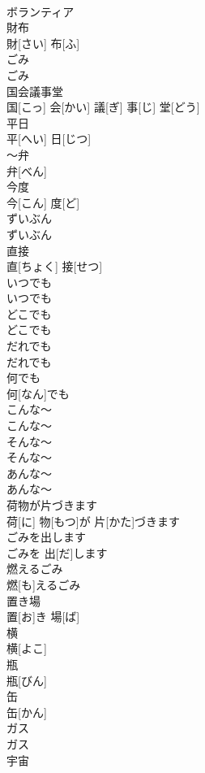 \documentclass[8pt]{extreport}
\begin{document}
\begin{CJK}{UTF8}{min}
\\	ボランティア		
\\	財布	
\\	財[さい] 布[ふ]		
\\	ごみ	
\\	ごみ		
\\	国会議事堂	
\\	国[こっ] 会[かい] 議[ぎ] 事[じ] 堂[どう]		
\\	平日	
\\	平[へい] 日[じつ]		
\\	～弁	
\\	弁[べん]		
\\	今度	
\\	今[こん] 度[ど]		
\\	ずいぶん	
\\	ずいぶん		
\\	直接	
\\	直[ちょく] 接[せつ]		
\\	いつでも	
\\	いつでも		
\\	どこでも	
\\	どこでも		
\\	だれでも	
\\	だれでも		
\\	何でも	
\\	何[なん]でも		
\\	こんな～	
\\	こんな～		
\\	そんな～	
\\	そんな～		
\\	あんな～	
\\	あんな～		
\\	荷物が片づきます	
\\	荷[に] 物[もつ]が 片[かた]づきます		
\\	ごみを出します	
\\	ごみを 出[だ]します		
\\	燃えるごみ	
\\	燃[も]えるごみ		
\\	置き場	
\\	置[お]き 場[ば]		
\\	横	
\\	横[よこ]		
\\	瓶	
\\	瓶[びん]		
\\	缶	
\\	缶[かん]		
\\	ガス	
\\	ガス		
\\	宇宙	

\end{CJK}
\end{document}
